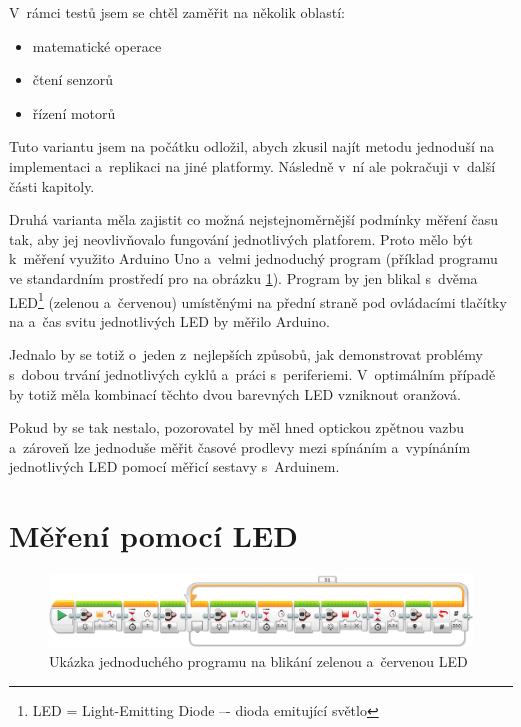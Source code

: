 V~rámci testů jsem se chtěl zaměřit na několik oblastí: %

\begin{itemize}
	\item matematické operace
	\item čtení senzorů
	\item řízení motorů
\end{itemize}  

Tuto variantu jsem na počátku odložil, abych zkusil najít metodu jednoduší na implementaci a~replikaci na jiné platformy. Následně v~ní ale pokračuji v~další části kapitoly.

Druhá varianta měla zajistit co možná nejstejnoměrnější podmínky měření času tak, aby jej neovlivňovalo fungování jednotlivých platforem. 
Proto mělo být k~měření využito Arduino Uno a~velmi jednoduchý program  (příklad programu ve standardním prostředí pro \EVthree{ }na obrázku \ref{fig:LoopTimeLEDblinking-measuring}).
Program by jen blikal s~dvěma LED\footnote{LED = Light-Emitting Diode –- dioda emitující světlo} (zelenou a~červenou) umístěnými na přední straně pod ovládacími tlačítky na  a~čas svitu jednotlivých LED by měřilo Arduino.




Jednalo by se totiž o~jeden z~nejlepších způsobů, jak demonstrovat problémy s~dobou trvání jednotlivých cyklů a~práci s~periferiemi. 
V~optimálním případě by totiž měla kombinací těchto dvou barevných LED vzniknout oranžová. 

Pokud by se tak nestalo, pozorovatel by měl hned optickou zpětnou vazbu a~zároveň lze jednoduše měřit časové prodlevy mezi spínáním a~vypínáním jednotlivých LED pomocí měřicí sestavy s~Arduinem.

\section{Měření pomocí LED}


\begin{figure}[h]
	\centering
	\includegraphics[width=\textwidth]{images/measuring-ev3-software_LoopTimeLEDblinking.png}
	\caption[Ukázka jednoduchého programu na blikání zelenou a~červenou LED]{Ukázka jednoduchého programu na blikání zelenou a~červenou LED}
	\label{fig:LoopTimeLEDblinking-measuring}
\end{figure}

